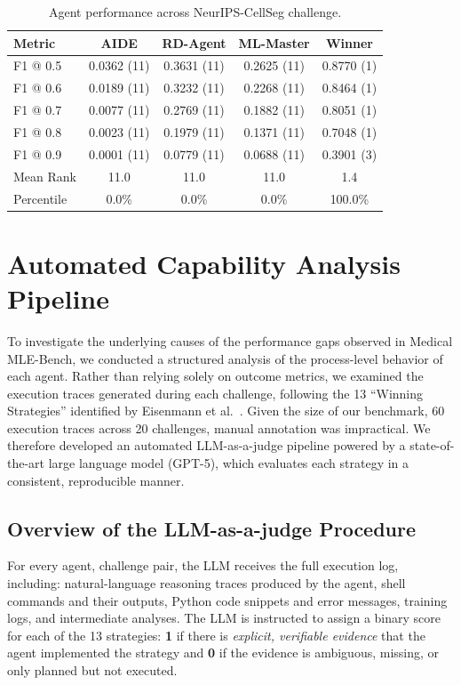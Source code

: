 \begin{table}[!t]
\centering
\small
\caption{Agent performance across NeurIPS-CellSeg challenge.}
\vspace{3pt} \label{tab:neurips-cellseg}
\begin{tabular}{lcccc}
\toprule
\textbf{Metric} & \textbf{AIDE} & \textbf{RD-Agent} & \textbf{ML-Master} & \textbf{Winner} \\
\midrule
F1 @ 0.5 & 0.0362 (11) & 0.3631 (11) & 0.2625 (11) & 0.8770 (1) \\
F1 @ 0.6 & 0.0189 (11) & 0.3232 (11) & 0.2268 (11) & 0.8464 (1) \\
F1 @ 0.7 & 0.0077 (11) & 0.2769 (11) & 0.1882 (11) & 0.8051 (1) \\
F1 @ 0.8 & 0.0023 (11) & 0.1979 (11) & 0.1371 (11) & 0.7048 (1) \\
F1 @ 0.9 & 0.0001 (11) & 0.0779 (11) & 0.0688 (11) & 0.3901 (3) \\
\midrule
Mean Rank & 11.0 & 11.0 & 11.0 & 1.4 \\
Percentile & 0.0\% & 0.0\% & 0.0\% & 100.0\% \\
\bottomrule
\end{tabular}
\end{table}

\clearpage 

\section{Automated Capability Analysis Pipeline}
\vspace{3pt} \label{appendix:capability-analysis}

To investigate the underlying causes of the performance gaps observed in Medical MLE-Bench, we conducted a structured analysis of the process-level behavior of each agent. Rather than relying solely on outcome metrics, we examined the execution traces generated during each challenge, following the 13 ``Winning Strategies'' identified by Eisenmann et al.~\cite{eisenmann2023winner}. Given the size of our benchmark, 60 execution traces across 20 challenges, manual annotation was impractical. We therefore developed an automated LLM-as-a-judge pipeline powered by a state-of-the-art large language model (GPT-5), which evaluates each strategy in a consistent, reproducible manner. 

\subsection{Overview of the LLM-as-a-judge Procedure}
For every agent, challenge pair, the LLM receives the full execution log, including: natural-language reasoning traces produced by the agent,  shell commands and their outputs, Python code snippets and error messages, training logs, and intermediate analyses. The LLM is instructed to assign a binary score for each of the 13 strategies: \textbf{1} if there is \emph{explicit, verifiable evidence} that the agent implemented the strategy and \textbf{0} if the evidence is ambiguous, missing, or only planned but not executed.

